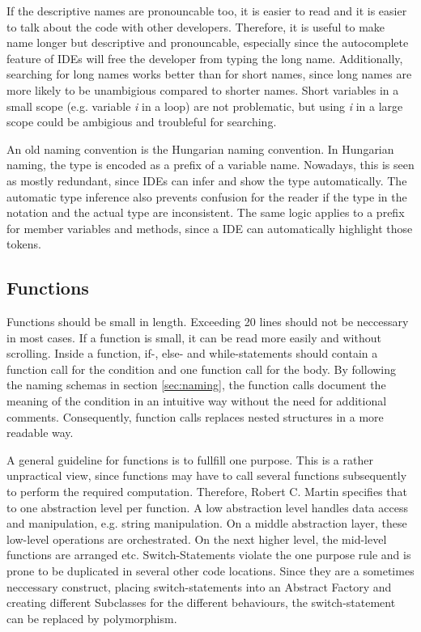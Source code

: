 If the descriptive names are pronouncable too, it is easier to read and it is easier to talk about the code with other developers. Therefore, it is useful to make name longer but descriptive and pronouncable, especially since the autocomplete feature of IDEs will free the developer from typing the long name. Additionally, searching for long names works better than for short names, since long names are more likely to be unambigious compared to shorter names. Short variables in a small scope (e.g. variable \textit{i} in a loop) are not problematic, but using \textit{i} in a large scope could be ambigious and troubleful for searching.

An old naming convention is the Hungarian naming convention. In Hungarian naming, the type is encoded as a prefix of a variable name. Nowadays, this is seen as mostly redundant, since IDEs can infer and show the type automatically. The automatic type inference also prevents confusion for the reader if the type in the notation and the actual type are inconsistent. The same logic applies to a prefix for member variables and methods, since a IDE can automatically highlight those tokens.

\subsection{Functions}
Functions should be small in length. Exceeding 20 lines should not be neccessary in most cases. If a function is small, it can be read more easily and without scrolling. Inside a function, if-, else- and while-statements should contain a function call for the condition and one function call for the body.  By following the naming schemas in section \ref{sec:naming}, the function calls document the meaning of the condition in an intuitive way without the need for additional comments. Consequently, function calls replaces nested structures in a more readable way.

A general guideline for functions is to fullfill one purpose. This is a rather unpractical view, since functions may have to call several functions subsequently to perform the required computation. Therefore, Robert C. Martin specifies that to one abstraction level per function. A low abstraction level handles data access and manipulation, e.g. string manipulation. On a middle abstraction layer, these low-level operations are orchestrated. On the next higher level, the mid-level functions are arranged etc. Switch-Statements violate the one purpose rule and is prone to be duplicated in several other code locations. Since they are a sometimes neccessary construct, placing switch-statements into an Abstract Factory and creating different Subclasses for the different behaviours, the switch-statement can be replaced by polymorphism. 

